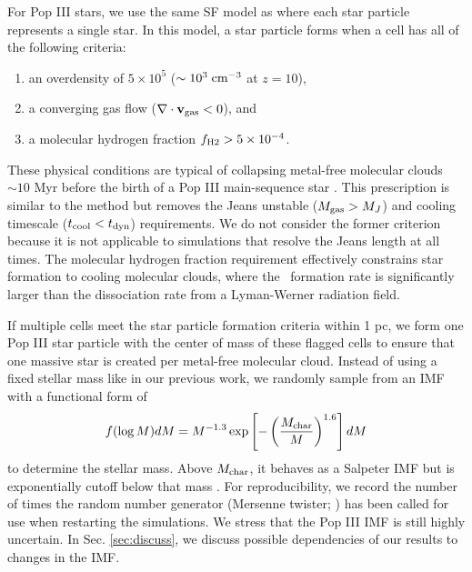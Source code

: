 \documentclass[12pt,preprint]{aastex}
\begin{document}

For Pop III stars, we use the same SF model as \citet{Wise08_Gal}
where each star particle represents a single star.  In this model, a
star particle forms when a cell has all of the following criteria:
%
\begin{enumerate}
\item an overdensity of $5 \times 10^5$ ($\sim 10^3\; \cubecm$ at
  $z=10$),
\item a converging gas flow ($\nabla \cdot \mathbf{v}_{\rm gas} < 0$),
  and
\item a molecular hydrogen fraction $f_{\rm H2} > 5 \times 10^{-4}$.
\end{enumerate}
%
These physical conditions are typical of collapsing metal-free
molecular clouds $\sim 10$ Myr before the birth of a Pop III
main-sequence star \citep{ABN02, OShea07a}.  This prescription is
similar to the \citet{Cen92} method but removes the Jeans unstable
($M_{\rm gas} > M_J$) and cooling timescale ($t_{\rm cool} < t_{\rm
  dyn}$) requirements.  We do not consider the former criterion
because it is not applicable to simulations that resolve the Jeans
length at all times.  The molecular hydrogen fraction requirement
effectively constrains star formation to cooling molecular clouds,
where the \hh~formation rate is significantly larger than the
dissociation rate from a Lyman-Werner radiation field.

If multiple cells meet the star particle formation criteria within 1
pc, we form one Pop III star particle with the center of mass of these
flagged cells to ensure that one massive star is created per
metal-free molecular cloud.  Instead of using a fixed stellar mass
like in our previous work, we randomly sample from an IMF with a
functional form of
%
\begin{equation}
\label{eqn:imf}
f(\log M) dM = M^{-1.3} \exp\left[-\left(\frac{M_{\rm
      char}}{M}\right)^{1.6}\right] dM
\end{equation}
%
to determine the stellar mass.  Above $M_{\rm char}$, it behaves as a
Salpeter IMF but is exponentially cutoff below that mass
\citep{Chabrier03, Clark09}.  For reproducibility, we record the
number of times the random number generator (Mersenne twister;
\citet{MTwister}) has been called for use when restarting the
simulations.  We stress that the Pop III IMF is still highly
uncertain.  In Sec. \ref{sec:discuss}, we discuss possible
dependencies of our results to changes in the IMF.  
\end{document}

